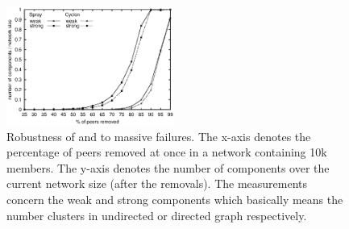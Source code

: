 \begin{figure}
  \centering
  \includegraphics[width=0.49\textwidth]{img/resilience.eps}
  \caption{\label{fig:resilience}Robustness of \CYCLON and \SPRAY to massive
    failures. The x-axis denotes the percentage of peers removed at once in a
    network containing 10k members. The y-axis denotes the number of
    components over the current network size (after the removals). The
    measurements concern the weak and strong components which basically means
    the number clusters in undirected or directed graph respectively.}
\end{figure}


